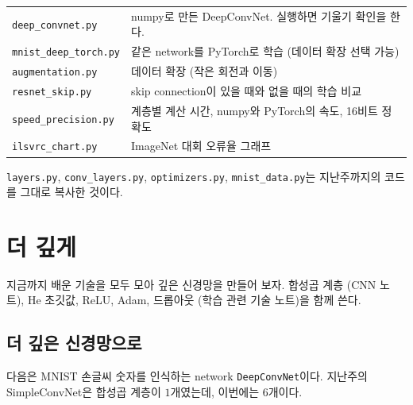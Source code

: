 \documentclass[11pt,a4paper]{article}
\begin{document}
\begin{remarkbox}
\begin{tabular}{@{}ll@{}}
\texttt{deep\_convnet.py} & numpy로 만든 DeepConvNet. 실행하면 기울기 확인을 한다. \\
\texttt{mnist\_deep\_torch.py} & 같은 network를 PyTorch로 학습 (데이터 확장 선택 가능) \\
\texttt{augmentation.py} & 데이터 확장 (작은 회전과 이동) \\
\texttt{resnet\_skip.py} & skip connection이 있을 때와 없을 때의 학습 비교 \\
\texttt{speed\_precision.py} & 계층별 계산 시간, numpy와 PyTorch의 속도, 16비트 정확도 \\
\texttt{ilsvrc\_chart.py} & ImageNet 대회 오류율 그래프 \\
\end{tabular}

\texttt{layers.py}, \texttt{conv\_layers.py}, \texttt{optimizers.py}, \texttt{mnist\_data.py}는 지난주까지의 코드를 그대로 복사한 것이다.
\end{remarkbox}

\section{더 깊게}\label{sec:deeper}

지금까지 배운 기술을 모두 모아 깊은 신경망을 만들어 보자.
합성곱 계층 (CNN 노트), He 초깃값, ReLU, Adam, 드롭아웃 (학습 관련 기술 노트)을 함께 쓴다.

\subsection{더 깊은 신경망으로}\label{sec:deepconvnet}

다음은 MNIST 손글씨 숫자를 인식하는 network \texttt{DeepConvNet}이다.
지난주의 SimpleConvNet은 합성곱 계층이 $1$개였는데, 이번에는 $6$개이다.
\end{document}
